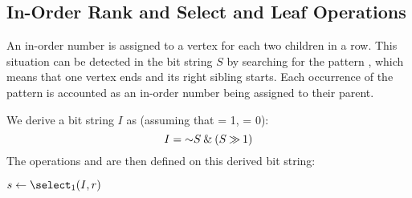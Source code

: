 \begin{algorithm}
\begin{algorithmic}
	\State {}
\EndFunction
\end{algorithmic}
\end{algorithm}

\begin{algorithm}
\begin{algorithmic}
	\State {}
\EndFunction
\end{algorithmic}
\end{algorithm}

\subsection{In-Order Rank and Select and Leaf Operations}

An in-order number is assigned to a vertex for each two children in a row.
This situation can be detected in the bit string $S$ by searching for the pattern \str{)(}, which means that one vertex ends and its right sibling starts.
Each occurrence of the pattern is accounted as an in-order number being assigned to their parent.

We derive a bit string $I$ as (assuming that \openingParen = 1, \closingParen = 0):
$$ I = \mathord{\sim} S \mathbin{\&} (S \mathbin{\gg} 1) $$
The operations \inRank{} and \inSelect{} are then defined on this derived bit string:

\begin{algorithm}
\begin{algorithmic}
		\State {}
	\Else
		\State {}
	\EndIf
\EndFunction
\end{algorithmic}
\end{algorithm}

\begin{algorithm}
\begin{algorithmic}
	\State $s \gets \select_1(I, r)$
	 
		\State {}
	\Else
		\State {}
	\EndIf
\EndFunction
\end{algorithmic}
\end{algorithm}

\bigbreak

